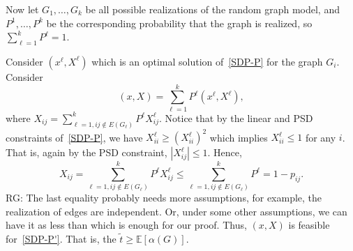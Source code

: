 \documentclass{article}
\newcommand{\E}{\mathbb{E}}
\newcommand{\rgnote}[1]{{\color{magenta} RG: #1}}
\begin{document}
 Now let $G_1,\ldots,G_k$ be all possible realizations of the random graph model, and $P^1,\ldots,P^k$ be the corresponding probability that the graph is realized, so $\sum_{\ell=1}^{k}P^\ell=1$.

Consider $(x^\ell,X^\ell)$ which is an optimal solution of~\ref{SDP-P} for the graph $G_i$.
Consider 
\[(x,X)=\sum_{\ell=1}^{k}P^\ell(x^\ell,X^\ell),\]
where $X_{ij}=\sum_{\ell=1,ij\notin E(G_\ell)}^{k}P^\ell X^\ell_{ij}$.
Notice that by the linear and PSD constraints of~\ref{SDP-P}, we have $X^\ell_{ii}\geq (X^\ell_{ii})^2$ which implies $X^\ell_{ii}\leq 1$ for any $i$. 
That is, again by the PSD constraint, $|X^\ell_{ij}|\leq 1$.
Hence,
\[X_{ij}=\sum_{\ell=1,ij\notin E(G_\ell)}^{k}P^\ell X^\ell_{ij}\leq \sum_{\ell=1,ij\notin E(G_\ell)}^{k}P^\ell = 1-p_{ij}.\]
\rgnote{The last equality probably needs more assumptions, for example, the realization of edges are independent.
Or, under some other assumptions, we can have it as less than which is enough for our proof.}
Thus, $(x,X)$ is feasible for~\ref{SDP-P'}.
That is, the $\tilde{t}\geq \E[\alpha(G)]$. 
\end{document}
